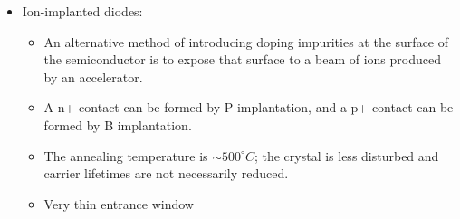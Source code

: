 \begin{itemize}
\begin{itemize}
    \end{itemize}
    \item Ion-implanted diodes:
    \begin{itemize}
        \item An alternative method of introducing doping impurities at the surface of the semiconductor is to expose that surface to a beam of ions produced by an accelerator. 
        \item A n+ contact can be formed by P implantation, and a p+ contact can be formed by B implantation.
        \item The annealing temperature is $\sim500^\circ C$; the crystal is less disturbed and carrier lifetimes are not necessarily reduced. 
        \item Very thin entrance window
    \end{itemize}
\end{itemize}
